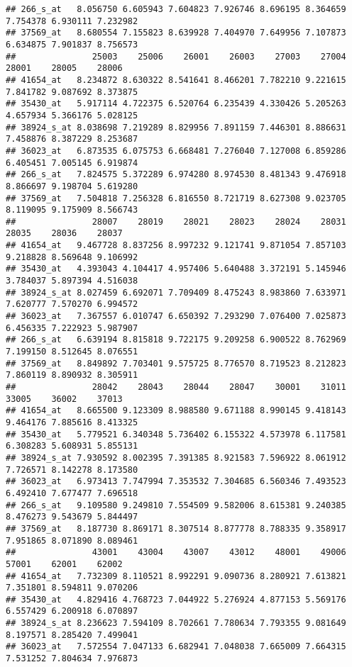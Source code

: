 \begin{verbatim}
## 266_s_at   8.056750 6.605943 7.604823 7.926746 8.696195 8.364659 7.754378 6.930111 7.232982
## 37569_at   8.680554 7.155823 8.639928 7.404970 7.649956 7.107873 6.634875 7.901837 8.756573
##               25003    25006    26001    26003    27003    27004    28001    28005    28006
## 41654_at   8.234872 8.630322 8.541641 8.466201 7.782210 9.221615 7.841782 9.087692 8.373875
## 35430_at   5.917114 4.722375 6.520764 6.235439 4.330426 5.205263 4.657934 5.366176 5.028125
## 38924_s_at 8.038698 7.219289 8.829956 7.891159 7.446301 8.886631 7.458876 8.387229 8.253687
## 36023_at   6.873535 6.075753 6.668481 7.276040 7.127008 6.859286 6.405451 7.005145 6.919874
## 266_s_at   7.824575 5.372289 6.974280 8.974530 8.481343 9.476918 8.866697 9.198704 5.619280
## 37569_at   7.504818 7.256328 6.816550 8.721719 8.627308 9.023705 8.119095 9.175909 8.566743
##               28007    28019    28021    28023    28024    28031    28035    28036    28037
## 41654_at   9.467728 8.837256 8.997232 9.121741 9.871054 7.857103 9.218828 8.569648 9.106992
## 35430_at   4.393043 4.104417 4.957406 5.640488 3.372191 5.145946 3.784037 5.897394 4.516038
## 38924_s_at 8.027459 6.692071 7.709409 8.475243 8.983860 7.633971 7.620777 7.570270 6.994572
## 36023_at   7.367557 6.010747 6.650392 7.293290 7.076400 7.025873 6.456335 7.222923 5.987907
## 266_s_at   6.639194 8.815818 9.722175 9.209258 6.900522 8.762969 7.199150 8.512645 8.076551
## 37569_at   8.849892 7.703401 9.575725 8.776570 8.719523 8.212823 7.860119 8.890932 8.305911
##               28042    28043    28044    28047    30001    31011    33005    36002    37013
## 41654_at   8.665500 9.123309 8.988580 9.671188 8.990145 9.418143 9.464176 7.885616 8.413325
## 35430_at   5.779521 6.340348 5.736402 6.155322 4.573978 6.117581 6.308283 5.608931 5.855131
## 38924_s_at 7.930592 8.002395 7.391385 8.921583 7.596922 8.061912 7.726571 8.142278 8.173580
## 36023_at   6.973413 7.747994 7.353532 7.304685 6.560346 7.493523 6.492410 7.677477 7.696518
## 266_s_at   9.109580 9.249810 7.554509 9.582006 8.615381 9.240385 8.476273 9.543679 5.844497
## 37569_at   8.187730 8.869171 8.307514 8.877778 8.788335 9.358917 7.951865 8.071890 8.089461
##               43001    43004    43007    43012    48001    49006    57001    62001    62002
## 41654_at   7.732309 8.110521 8.992291 9.090736 8.280921 7.613821 7.351801 8.594811 9.070206
## 35430_at   4.829416 4.768723 7.044922 5.276924 4.877153 5.569176 6.557429 6.200918 6.070897
## 38924_s_at 8.236623 7.594109 8.702661 7.780634 7.793355 9.081649 8.197571 8.285420 7.499041
## 36023_at   7.572554 7.047133 6.682941 7.048038 7.665009 7.664315 7.531252 7.804634 7.976873

\end{verbatim}
